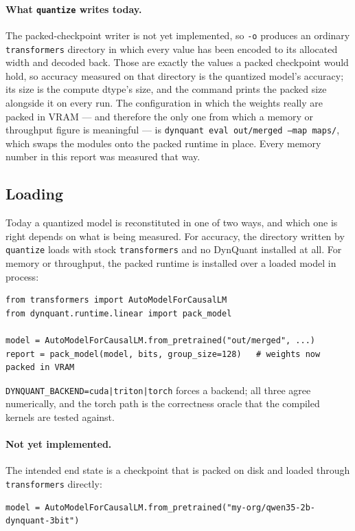 \documentclass[11pt]{article}
\newcommand{\code}[1]{\texttt{#1}}
\begin{document}
\paragraph{What \code{quantize} writes today.} The packed-checkpoint writer is not yet
implemented, so \code{-o} produces an ordinary \code{transformers} directory in which every value
has been encoded to its allocated width and decoded back. Those are exactly the values a packed
checkpoint would hold, so accuracy measured on that directory is the quantized model's accuracy;
its size is the compute dtype's size, and the command prints the packed size alongside it on
every run. The configuration in which the weights really are packed in VRAM --- and therefore the
only one from which a memory or throughput figure is meaningful --- is \code{dynquant eval
out/merged --map maps/}, which swaps the modules onto the packed runtime in place. Every memory
number in this report was measured that way.

\subsection{Loading}

Today a quantized model is reconstituted in one of two ways, and which one is right depends on
what is being measured. For accuracy, the directory written by \code{quantize} loads with stock
\code{transformers} and no DynQuant installed at all. For memory or throughput, the packed
runtime is installed over a loaded model in process:

\begin{verbatim}
from transformers import AutoModelForCausalLM
from dynquant.runtime.linear import pack_model

model = AutoModelForCausalLM.from_pretrained("out/merged", ...)
report = pack_model(model, bits, group_size=128)   # weights now packed in VRAM
\end{verbatim}

\code{DYNQUANT\_BACKEND=cuda|triton|torch} forces a backend; all three agree numerically, and the
torch path is the correctness oracle that the compiled kernels are tested against.

\paragraph{Not yet implemented.} The intended end state is a checkpoint that is packed on disk
and loaded through \code{transformers} directly:

\begin{verbatim}
model = AutoModelForCausalLM.from_pretrained("my-org/qwen35-2b-dynquant-3bit")
\end{verbatim}
\end{document}
